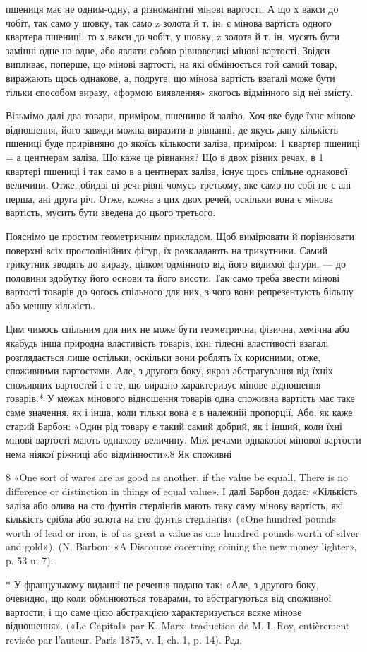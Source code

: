 пшениця має не одним-одну, а різноманітні мінові вартості.
А що х вакси до чобіт, так само у шовку, так само z золота й т. ін.
є мінова вартість одного квартера пшениці, то х вакси до чобіт,
у шовку, z золота й т. ін. мусять бути замінні одне на одне, або
являти собою рівновеликі мінові вартості. Звідси випливає, поперше,
що мінові вартості, на які обмінюється той самий товар,
виражають щось однакове, а, подруге, що мінова вартість взагалі
може бути тільки способом виразу, «формою виявлення» якогось
відмінного від неї змісту.

Візьмімо далі два товари, приміром, пшеницю й залізо. Хоч
яке буде їхнє мінове відношення, його завжди можна виразити
в рівнанні, де якусь дану кількість пшениці буде прирівняно до
якоїсь кількости заліза, приміром: 1 квартер пшениці = а центнерам
заліза. Що каже це рівнання? Що в двох різних речах,
в 1 квартері пшениці і так само в а центнерах заліза, існує щось
спільне однакової величини. Отже, обидві ці речі рівні чомусь
третьому, яке само по собі не є ані перша, ані друга річ. Отже,
кожна з цих двох речей, оскільки вона є мінова вартість, мусить
бути зведена до цього третього.

Пояснімо це простим геометричним прикладом. Щоб вимірювати
й порівнювати поверхні всіх простолінійних фігур, їх розкладають
на трикутники. Самий трикутник зводять до виразу,
цілком одмінного від його видимої фігури, — до половини здобутку
його основи та його висоти. Так само треба звести мінові
вартості товарів до чогось спільного для них, з чого вони репрезентують
більшу або меншу кількість.

Цим чимось спільним для них не може бути геометрична, фізична,
хемічна або якабудь інша природна властивість товарів,
їхні тілесні властивості взагалі розглядається лише остільки,
оскільки вони роблять їх корисними, отже, споживними вартостями.
Але, з другого боку, якраз абстрагування від їхніх споживних
вартостей і є те, що виразно характеризує мінове відношення
товарів.* У межах мінового відношення товарів одна споживна
вартість має таке саме значення, як і інша, коли тільки
вона є в належній пропорції. Або, як каже старий Барбон: «Один
рід товару є такий самий добрий, як і інший, коли їхні мінові
вартості мають однакову величину. Між речами однакової мінової
вартости нема ніякої ріжниці або відмінности».8 Як споживні

8 «One sort of wares are as good as another, if the value be equall.
There is no difference or distinction in things of equal value». І далі Барбон
додає: «Кількість заліза або олива на сто фунтів стерлінґів мають таку
саму мінову вартість, які кількість срібла або золота на сто фунтів стерлінґів»
(«One hundred pounds worth of lead or iron, is of as great a value
as one hundred pounds worth of silver and gold»). (N. Barbon: «A Discourse
cocerning coining the new money lighter», p. 53 u. 7).

* У французькому виданні це речення подано так: «Але, з другого
боку, очевидно, що коли обмінюються товарами, то абстрагуються від
споживної вартости, і що саме цією абстракцією характеризується всяке
мінове відношення». («Le Capital» par K. Marx, traduction de M. I. Roy,
entièrement revisée par l’auteur. Paris 1875, v. I, ch. 1, p. 14). Ред.
